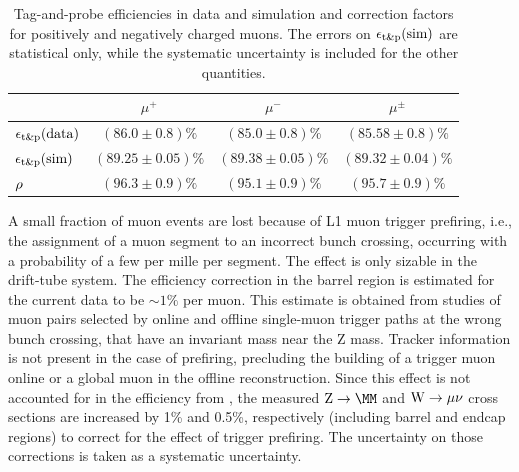 \begin{table}[htb] %
    \begin{center}
    \caption{Tag-and-probe efficiencies in data and simulation and correction factors 
for positively and negatively charged muons.
The errors on  $\epsilon_{\mathrm{t\&p}}(\mathrm{sim)}$ are statistical only, while the systematic uncertainty is included for
the other quantities.
}
    \label{tab:effic_charge}
      \begin{tabular}{|l|c|c|c|} \hline
                    &            $\mu^+$            &            $\mu^-$           &                     $\mu^\pm$ \\ \hline\hline
        $\epsilon_{\mathrm{t\&p}}(\mathrm{data})$  & $(86.0 \pm 0.8)\%$ & $(85.0 \pm 0.8)\%$ & $(85.58 \pm 0.8)\%$ \\
        $\epsilon_{\mathrm{t\&p}}(\mathrm{sim)}$    & $(89.25 \pm 0.05 )\%$         & $(89.38 \pm 0.05)\%$         & $(89.32 \pm 0.04)\%$        \\
        $\rho$   & $(96.3 \pm 0.9)\%$ & $(95.1 \pm 0.9)\%$& $(95.7 \pm 0.9)\%$\\

      \hline
      \end{tabular}
    \end{center}
  \end{table}

A small fraction of muon events are lost because of L1 muon trigger prefiring, i.e., the assignment
of a muon segment to an incorrect bunch crossing, occurring with a 
probability of a few per mille per segment.
The effect is only sizable in the drift-tube system. The efficiency correction in the barrel region
is estimated for the current data to be ${\sim}1\%$ per muon. This estimate is
obtained from studies of muon pairs selected by online and offline single-muon trigger paths at
the wrong bunch crossing, that have an invariant mass near the Z mass. 
Tracker information is not present in the case of prefiring, precluding the building of a 
trigger muon online or a global muon in the offline reconstruction. 
Since this effect is not accounted for in the efficiency from \TNP,
the measured $\Zmm$ and $\mathrm{W} \rightarrow \mu\nu$ cross sections are increased by 1\% and 0.5\%, 
respectively (including barrel and endcap regions)
to correct for the effect of trigger prefiring. The uncertainty on those corrections
is taken as a systematic uncertainty.

